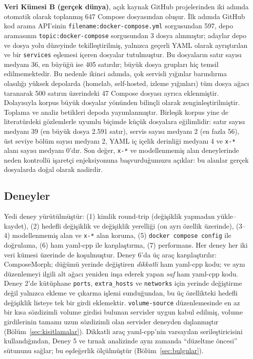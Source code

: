 \documentclass[conference]{IEEEtran}
\begin{document}
\textbf{Veri Kümesi B (gerçek dünya)}, açık kaynak GitHub projelerinden
iki adımda otomatik olarak toplanmış 647 Compose dosyasından oluşur.
İlk adımda GitHub kod arama API'sinin
\texttt{filename:docker-compose.yml} sorgusundan 597, depo aramasının
\texttt{topic:docker-compose} sorgusundan 3 dosya alınmıştır; adaylar depo
ve dosya yolu düzeyinde tekilleştirilmiş, yalnızca geçerli YAML olarak
ayrıştırılan ve bir \texttt{services} eşlemesi içeren dosyalar
tutulmuştur. Bu dosyaların satır sayısı medyanı 36, en büyüğü ise 405
satırdır; büyük dosya grupları hiç temsil edilmemektedir. Bu nedenle
ikinci adımda, çok servisli yığınlar barındırma olasılığı yüksek depolarda
(homelab, self-hosted, izleme yığınları) tüm dosya ağacı taranarak 500
satırın üzerindeki 47 Compose dosyası ayrıca eklenmiştir. Dolayısıyla
korpus büyük dosyalar yönünden bilinçli olarak zenginleştirilmiştir.
Toplama ve analiz betikleri depoda yayımlanmıştır. Birleşik korpus yine de
literatürdeki gözlemlerle uyumlu biçimde küçük dosyalara eğilimlidir:
satır sayısı medyanı 39 (en büyük dosya 2.591 satır), servis sayısı
medyanı 2 (en fazla 56), üst seviye bölüm sayısı medyanı 2, YAML iç içelik
derinliği medyanı 4 ve \texttt{x-*} alanı sayısı medyanı 0'dır. Son değer, \texttt{x-*}
ve modellenmemiş alan deneylerinde neden kontrollü işaretçi enjeksiyonuna
başvurduğumuzu açıklar: bu alanlar gerçek dosyalarda doğal olarak nadirdir.

\subsection{Deneyler}
Yedi deney yürütülmüştür: (1) kimlik round-trip (değişiklik yapmadan
yükle--kaydet), (2) hedefli değişiklik ve değişiklik yerelliği (on ayrı
özellik üzerinde), (3--4) modellenmemiş alan ve \texttt{x-*} alan
koruma, (5) \texttt{docker compose config} ile doğrulama, (6) ham yaml-cpp
ile karşılaştırma, (7) performans. Her deney her iki veri kümesi üzerinde
de koşulmuştur. Deney 6'da üç araç karşılaştırılır: ComposeMorph; düğümü
yerinde değiştiren \emph{dikkatli} ham yaml-cpp kodu; ve aynı düzenlemeyi
ilgili alt ağacı yeniden inşa ederek yapan \emph{saf} ham yaml-cpp kodu.
Deney 2'de kütüphane \texttt{ports}, \texttt{extra\_hosts} ve
\texttt{networks} için yerinde değiştirme değil yalnızca ekleme ve çıkarma
işlemi sunduğundan, bu üç özellikteki hedefli değişiklik listeye tek bir
girdi eklemektir. \texttt{volume-source} düzenlemesinde en az bir kısa
sözdizimli volume girdisi bulunan servisler uygun kabul edilmiş, volume
girdilerinin tamamı uzun sözdizimli olan servisler deneyden dışlanmıştır
(Bölüm~\ref{sec:kisitlamalar}).
Dikkatli araç yaml-cpp'nin varsayılan serileştiricisini kullandığından,
Deney 5 ve tırnak analizinde aynı zamanda ``düzeltme öncesi'' sütununu
sağlar; bu eşdeğerlik ölçülmüştür (Bölüm~\ref{sec:bulgular}).
\end{document}
